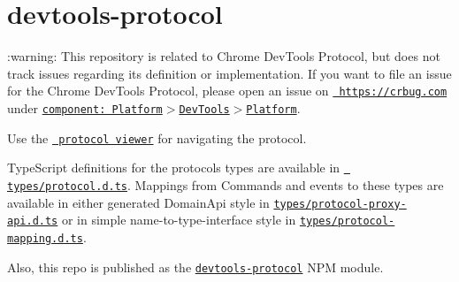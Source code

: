 \chapter{devtools-\/protocol}
\hypertarget{md__c_1_2_users_2_s_t_r_i_d_e_r_2source_2repos_2_ainslie_a_p_i_2wwwroot_2lib_2jquery-ui_2node__m40bce7f31b99d4522d60ee9d8e908d3c}{}\label{md__c_1_2_users_2_s_t_r_i_d_e_r_2source_2repos_2_ainslie_a_p_i_2wwwroot_2lib_2jquery-ui_2node__m40bce7f31b99d4522d60ee9d8e908d3c}
\label{md__c_1_2_users_2_s_t_r_i_d_e_r_2source_2repos_2_ainslie_a_p_i_2wwwroot_2lib_2jquery-ui_2node__m40bce7f31b99d4522d60ee9d8e908d3c_autotoc_md7832}%
%
 \+:warning\+: This repository is related to Chrome Dev\+Tools Protocol, but does not track issues regarding its definition or implementation. If you want to file an issue for the Chrome Dev\+Tools Protocol, please open an issue on \href{https://crbug.com}{\texttt{ https\+://crbug.\+com}} under \href{https://bugs.chromium.org/p/chromium/issues/entry?components=Platform\%3EDevTools\%3EPlatform}{\texttt{ {\ttfamily component\+: Platform\texorpdfstring{$>$}{>}Dev\+Tools\texorpdfstring{$>$}{>}Platform}}}.

Use the \href{https://chromedevtools.github.io/devtools-protocol/}{\texttt{ protocol viewer}} for navigating the protocol.

Type\+Script definitions for the protocol\textquotesingle{}s types are available in \href{https://github.com/ChromeDevTools/devtools-protocol/tree/master/types}{\texttt{ \textquotesingle{}types/protocol.\+d.\+ts\textquotesingle{}}}. Mappings from Commands and events to these types are available in either generated {\ttfamily Domain\+Api} style in \href{https://github.com/ChromeDevTools/devtools-protocol/blob/master/types/protocol-proxy-api.d.ts}{\texttt{ {\ttfamily types/protocol-\/proxy-\/api.\+d.\+ts}}} or in simple name-\/to-\/type-\/interface style in \href{https://github.com/ChromeDevTools/devtools-protocol/blob/master/types/protocol-mapping.d.ts}{\texttt{ {\ttfamily types/protocol-\/mapping.\+d.\+ts}}}.

Also, this repo is published as the \href{https://www.npmjs.com/package/devtools-protocol}{\texttt{ {\ttfamily devtools-\/protocol}}} NPM module.  